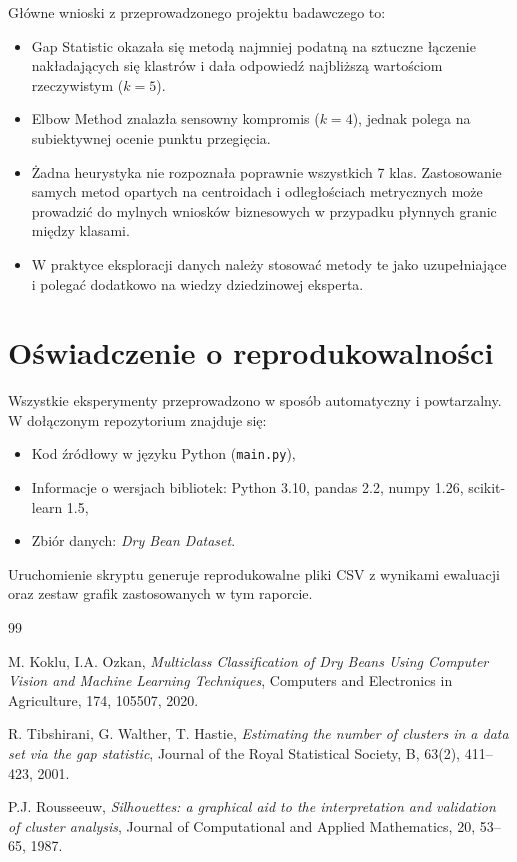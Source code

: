 \documentclass[11pt,a4paper]{article}
\begin{document}
Główne wnioski z przeprowadzonego projektu badawczego to:
\begin{itemize}[leftmargin=1.5cm]
    \item Gap Statistic okazała się metodą najmniej podatną na sztuczne łączenie nakładających się klastrów i dała odpowiedź najbliższą wartościom rzeczywistym ($k=5$).
    \item Elbow Method znalazła sensowny kompromis ($k=4$), jednak polega na subiektywnej ocenie punktu przegięcia.
    \item Żadna heurystyka nie rozpoznała poprawnie wszystkich 7 klas. Zastosowanie samych metod opartych na centroidach i odległościach metrycznych może prowadzić do mylnych wniosków biznesowych w przypadku płynnych granic między klasami.
    \item W praktyce eksploracji danych należy stosować metody te jako uzupełniające i polegać dodatkowo na wiedzy dziedzinowej eksperta.
\end{itemize}

\section*{Oświadczenie o reprodukowalności}

Wszystkie eksperymenty przeprowadzono w sposób automatyczny i powtarzalny. W dołączonym repozytorium znajduje się:
\begin{itemize}[leftmargin=1.5cm]
    \item Kod źródłowy w języku Python (\texttt{main.py}),
    \item Informacje o wersjach bibliotek: Python 3.10, pandas 2.2, numpy 1.26, scikit-learn 1.5,
    \item Zbiór danych: \textit{Dry Bean Dataset}.
\end{itemize}
Uruchomienie skryptu generuje reprodukowalne pliki CSV z wynikami ewaluacji oraz zestaw grafik zastosowanych w tym raporcie.

\begin{thebibliography}{99}

M. Koklu, I.A. Ozkan,
\textit{Multiclass Classification of Dry Beans Using Computer Vision and Machine Learning Techniques},
Computers and Electronics in Agriculture, 174, 105507, 2020.

R. Tibshirani, G. Walther, T. Hastie,
\textit{Estimating the number of clusters in a data set via the gap statistic},
Journal of the Royal Statistical Society, B, 63(2), 411--423, 2001.

P.J. Rousseeuw,
\textit{Silhouettes: a graphical aid to the interpretation and validation of cluster analysis},
Journal of Computational and Applied Mathematics, 20, 53--65, 1987.

\end{thebibliography}
\end{document}
